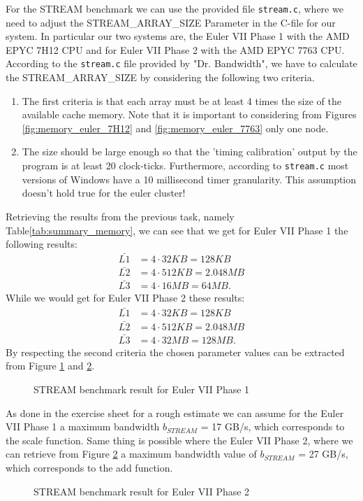 \documentclass[unicode,11pt,a4paper,oneside,numbers=endperiod,openany]{scrartcl}
\begin{document}
For the STREAM benchmark we can use the provided file \texttt{stream.c}, where we need to adjust the STREAM\_ARRAY\_SIZE Parameter
in the C-file for our system. In particular our two systems are, the Euler VII Phase 1 with the AMD EPYC 7H12 CPU and for Euler VII Phase 2
with the AMD EPYC 7763 CPU. According to the \texttt{stream.c} file provided by "Dr. Bandwidth", we have to calculate the STREAM\_ARRAY\_SIZE
by considering the following two criteria.
\begin{enumerate}
    \item {The first criteria is that each array must be at least 4 times the size of the available cache memory. Note that it is important to considering
           from Figures \ref{fig:memory_euler_7H12} and \ref{fig:memory_euler_7763} only one node.}
    \item {The size should be large enough so that the 'timing calibration' output by the program is at least 20 clock-ticks. Furthermore, 
    according to \texttt{stream.c} most versions of Windows have a 10 millisecond timer granularity. This assumption doesn't hold true for the euler
    cluster!}
\end{enumerate}
Retrieving the results from the previous task, namely Table\ref{tab:summary_memory}, we can see that we get for Euler VII Phase 1 the following results:
\begin{align*}
    \bar{L1} &= 4 \cdot 32 KB = 128 KB \\
    \bar{L2} &= 4 \cdot 512 KB = 2.048 MB \\
    \bar{L3} &= 4 \cdot 16 MB = 64 MB .
\end{align*}
While we would get for Euler VII Phase 2 these results:
\begin{align*}
    \bar{L1} &= 4 \cdot 32 KB = 128 KB \\
    \bar{L2} &= 4 \cdot 512 KB = 2.048 MB \\
    \bar{L3} &= 4 \cdot 32 MB = 128 MB .
\end{align*}
By respecting the second criteria the chosen parameter values can be extracted from Figure \ref{fig:slurm_euler_1} and \ref{fig:slurm_euler_2}.
\begin{figure}[H]
    \centering
    \caption{STREAM benchmark result for Euler VII Phase 1}
    \label{fig:slurm_euler_1}
\end{figure}
As done in the exercise sheet for a rough estimate we can assume for the Euler VII Phase 1 a maximum bandwidth $b_{STREAM}$ = 17 GB/s, which corresponds to the scale function.
Same thing is possible where the Euler VII Phase 2, where we can retrieve from Figure \ref{fig:slurm_euler_2} a maximum bandwidth value of $b_{STREAM}$ = 27 GB/s, which corresponds
to the add function.
\begin{figure}[H]
    \centering
    {\fontsize{8}{10}\selectfont
    }
    \caption{STREAM benchmark result for Euler VII Phase 2}
    \label{fig:slurm_euler_2}
\end{figure}
\end{document}
